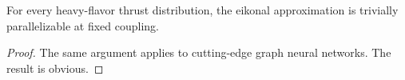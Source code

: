 \begin{lemma}\label{thm:3}
For every heavy-flavor thrust distribution, the eikonal approximation is
trivially parallelizable at fixed coupling.
\end{lemma}

\begin{proof}
The same argument applies to cutting-edge graph neural networks. The
result is obvious.
\end{proof}

